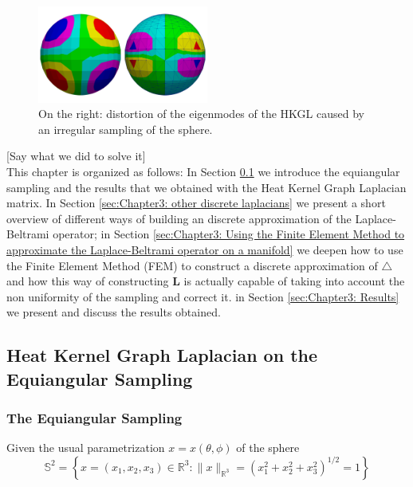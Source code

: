 \begin{figure}
	\label{fig:equiangular distortion}
	\begin{center}
			\includegraphics[width=0.5\textwidth]{../codes/04.imbalanced/confront_mixed.png}
	\end{center}
	\caption{On the right: distortion of the eigenmodes of the HKGL caused by an irregular sampling of the sphere.}
\end{figure}

[Say what we did to solve it]\\
This chapter is organized as follows: In Section \ref{sec:Chapter3: Heat Kernel Graph Laplacian on the Equiangular Sampling} we introduce the equiangular sampling and the results that we obtained with the Heat Kernel Graph Laplacian matrix. In Section \ref{sec:Chapter3: other discrete laplacians} we present a short overview of different ways of building an discrete approximation of the Laplace-Beltrami operator; in Section \ref{sec:Chapter3: Using the Finite Element Method to approximate the Laplace-Beltrami operator on a manifold} we deepen how to use the Finite Element Method (FEM) to construct a discrete approximation of $\triangle$ and how this way of constructing $\mathbf L$  is actually capable of taking into account the non uniformity of the sampling and correct it. in Section \ref{sec:Chapter3: Results} we present and discuss the results obtained.
\subsection{Heat Kernel Graph Laplacian on the Equiangular Sampling}
\label{sec:Chapter3: Heat Kernel Graph Laplacian on the Equiangular Sampling}

\subsubsection{The Equiangular Sampling}

Given the usual parametrization $x = x(\theta, \phi)$ of the sphere
$$
\mathbb{S}^{2}=\left\{x=\left(x_{1}, x_{2}, x_{3}\right) \in \mathbb{R}^{3} :\|x\|_{\mathbb{R}^{3}}=\left(x_{1}^{2}+x_{2}^{2}+x_{3}^{2}\right)^{1 / 2}=1\right\}
$$

